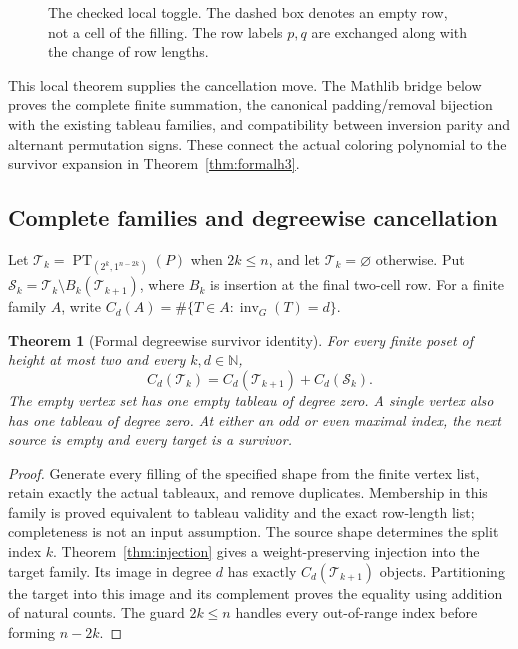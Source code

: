 \documentclass[11pt,a4paper]{article}
\newtheorem{theorem}{Theorem}[section]
\theoremstyle{definition}
\newcommand{\PT}{\operatorname{PT}}
\newcommand{\inv}{\operatorname{inv}}
\newcommand{\N}{\mathbb N}
\newcommand{\cell}[4]{\draw[draw=ink,fill=#4,rounded corners=1pt] (#1,#2) rectangle ++(.68,.68);\node[text=ink] at (#1+.34,#2+.34) {$#3$};}
\begin{document}
\begin{figure}[ht]
\centering
{}
\caption{The checked local toggle. The dashed box denotes an empty row,
not a cell of the filling. The row labels $p,q$ are exchanged along with
the change of row lengths.}\label{fig:signedtoggle}
\end{figure}

This local theorem supplies the cancellation move. The Mathlib bridge below
proves the complete finite summation, the canonical padding/removal bijection
with the existing tableau families, and compatibility between inversion
parity and alternant permutation signs. These connect the actual coloring
polynomial to the survivor expansion in Theorem~\ref{thm:formalh3}.

\subsection{Complete families and degreewise cancellation}

Let $\mathcal T_k=\PT_{(2^k,1^{n-2k})}(P)$ when $2k\le n$, and let
$\mathcal T_k=\varnothing$ otherwise. Put
$\mathcal S_k=\mathcal T_k\setminus B_k(\mathcal T_{k+1})$, where $B_k$
is insertion at the final two-cell row. For a finite family $A$, write
$C_d(A)=\#\{T\in A:\inv_G(T)=d\}$.

\begin{theorem}[Formal degreewise survivor identity]\label{thm:formalcounts}
For every finite poset of height at most two and every $k,d\in\N$,
\[
 C_d(\mathcal T_k)=C_d(\mathcal T_{k+1})+C_d(\mathcal S_k).
\]
The empty vertex set has one empty tableau of degree zero. A single vertex
also has one tableau of degree zero. At either an odd or even maximal index,
the next source is empty and every target is a survivor.
\end{theorem}
\begin{proof}
Generate every filling of the specified shape from the finite vertex list,
retain exactly the actual tableaux, and remove duplicates. Membership in this
family is proved equivalent to tableau validity and the exact row-length list;
completeness is not an input assumption. The source shape determines the split
index $k$. Theorem~\ref{thm:injection} gives a weight-preserving injection into
the target family. Its image in degree $d$ has exactly
$C_d(\mathcal T_{k+1})$ objects. Partitioning the target into this image and its
complement proves the equality using addition of natural counts. The guard
$2k\le n$ handles every out-of-range index before forming $n-2k$.
\end{proof}
\end{document}
